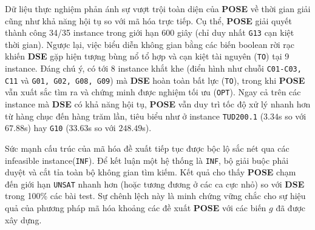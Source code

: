 \documentclass[letterpaper,journal]{IEEEtran}
\begin{document}
Dữ liệu thực nghiệm phản ánh sự vượt trội toàn diện của \textbf{POSE} về thời gian giải cũng như khả năng hội tụ so với mã hóa trực tiếp. Cụ thể, \textbf{POSE} giải quyết thành công 34/35 instance trong giới hạn 600 giây (chỉ duy nhất \texttt{G13} cạn kiệt thời gian). Ngược lại, việc biểu diễn không gian bằng các biến boolean rời rạc khiến \textbf{DSE} gặp hiện tượng bùng nổ tổ hợp và cạn kiệt tài nguyên (\texttt{TO}) tại 9 instance. Đáng chú ý, có tới 8 instance khắt khe (điển hình như chuỗi \texttt{C01-C03, C11} và \texttt{G01, G02, G08, G09}) mà \textbf{DSE} hoàn toàn bất lực (\texttt{TO}), trong khi \textbf{POSE} vẫn xuất sắc tìm ra và chứng minh được nghiệm tối ưu (\texttt{OPT}). Ngay cả trên các instance mà \textbf{DSE} có khả năng hội tụ, \textbf{POSE} vẫn duy trì tốc độ xử lý nhanh hơn từ hàng chục đến hàng trăm lần, tiêu biểu như ở instance \texttt{TUD200.1} ($3.34$s so với $67.88$s) hay \texttt{G10} ($33.63$s so với $248.49$s).

Sức mạnh cấu trúc của mã hóa đề xuất tiếp tục được bộc lộ sắc nét qua các infeasible instance(\texttt{INF}). Để kết luận một hệ thống là \texttt{INF}, bộ giải buộc phải duyệt và cắt tỉa toàn bộ không gian tìm kiếm. Kết quả cho thấy \textbf{POSE} chạm đến giới hạn \texttt{UNSAT} nhanh hơn (hoặc tương đương ở các ca cực nhỏ) so với \textbf{DSE} trong 100\% các bài test. Sự chênh lệch này là minh chứng vững chắc cho sự hiệu quả của phương pháp mã hóa khoảng các đề xuất \textbf{POSE} với các biến $g$ đã được xây dựng. 
\end{document}
